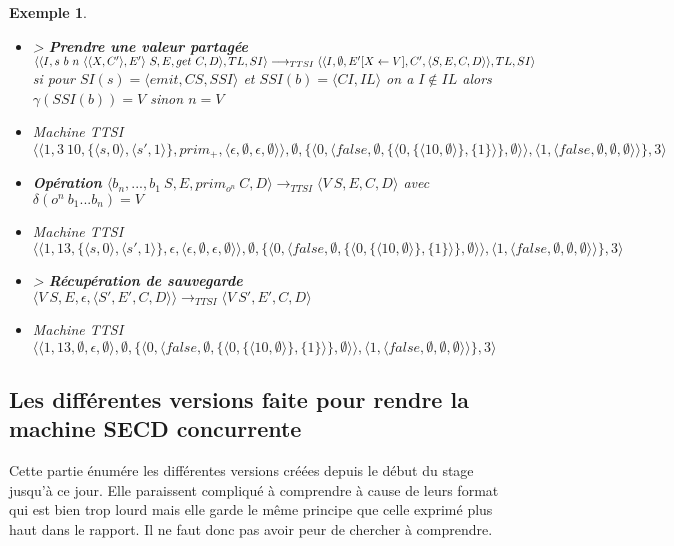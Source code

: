 \documentclass[10pt,a4paper]{report}
\newtheorem{ex}{Exemple}
\begin{document}
\begin{ex}
\begin{itemize}
			\item[] > \textbf{Prendre une valeur partagée} $\langle\langle I,s~b~n~\langle\langle X,C'\rangle,E'\rangle~S,E,get~C,D\rangle,TL,SI\rangle 
			\longrightarrow_{TTSI} 
			\\\langle\langle I,\emptyset,E'[X \leftarrow V],C',\langle S,E,C,D\rangle\rangle,TL,SI\rangle$
			\\ si pour $SI(s) = \langle emit,CS,SSI\rangle$ et $SSI(b) = \langle CI,IL\rangle$ on a $I \notin IL$ alors $\gamma(SSI(b)) = V$ sinon $n = V$
			\item[] Machine TTSI $\langle\langle 1,3~10,\{\langle s,0\rangle,\langle s',1\rangle\},prim_{+} ,\langle\epsilon,\emptyset,\epsilon,\emptyset\rangle\rangle,\emptyset,\{\langle 0,\langle false,\emptyset,\{\langle 0,\{\langle 10,\emptyset\rangle\},\{1\}\rangle\},\emptyset\rangle\rangle,\langle 1,\langle false,\emptyset,\emptyset,\emptyset\rangle\rangle\},3\rangle$ 
			\item[] \textbf{Opération} $\langle b_{n},...,b_{1}~S,E,prim_{o^{n}}~C,D\rangle
			\longrightarrow_{TTSI} 
			\langle V~S,E,C,D\rangle$ avec $\delta(o^{n}~b_{1}...b_{n}) = V$
			\item[] Machine TTSI $\langle\langle 1,13,\{\langle s,0\rangle,\langle s',1\rangle\},\epsilon ,\langle\epsilon,\emptyset,\epsilon,\emptyset\rangle\rangle,\emptyset,\{\langle 0,\langle false,\emptyset,\{\langle 0,\{\langle 10,\emptyset\rangle\},\{1\}\rangle\},\emptyset\rangle\rangle,\langle 1,\langle false,\emptyset,\emptyset,\emptyset\rangle\rangle\},3\rangle$ 
			\item[] > \textbf{Récupération de sauvegarde} $\langle V~S,E,\epsilon,\langle S',E',C,D\rangle\rangle
			\longrightarrow_{TTSI} 
			\langle V~S',E',C,D\rangle$
			\item[] Machine TTSI $\langle\langle 1,13,\emptyset,\epsilon,\emptyset\rangle,\emptyset,\{\langle 0,\langle false,\emptyset,\{\langle 0,\{\langle 10,\emptyset\rangle\},\{1\}\rangle\},\emptyset\rangle\rangle,\langle 1,\langle false,\emptyset,\emptyset,\emptyset\rangle\rangle\},3\rangle$ 
		\end{itemize}
	\end{ex}
	\newpage
	
	\subsection*{Les différentes versions faite pour rendre la machine SECD concurrente}
	
	Cette partie énumére les différentes versions créées depuis le début du stage jusqu'à ce jour. Elle paraissent compliqué à comprendre à cause de leurs format qui est bien trop lourd mais elle garde le même principe que celle exprimé plus haut dans le rapport. Il ne faut donc pas avoir peur de chercher à comprendre.
	
\end{document}

